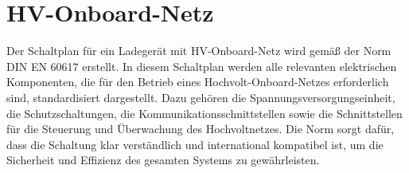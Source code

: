 \section*{HV-Onboard-Netz}

Der Schaltplan für ein Ladegerät mit HV-Onboard-Netz wird gemäß der Norm DIN EN 60617 erstellt. In diesem Schaltplan werden alle relevanten elektrischen Komponenten, die für den Betrieb eines Hochvolt-Onboard-Netzes erforderlich sind, standardisiert dargestellt. Dazu gehören die Spannungsversorgungseinheit, die Schutzschaltungen, die Kommunikationsschnittstellen sowie die Schnittstellen für die Steuerung und Überwachung des Hochvoltnetzes. Die Norm sorgt dafür, dass die Schaltung klar verständlich und international kompatibel ist, um die Sicherheit und Effizienz des gesamten Systems zu gewährleisten.
 
\addtocounter{page}{1} 
